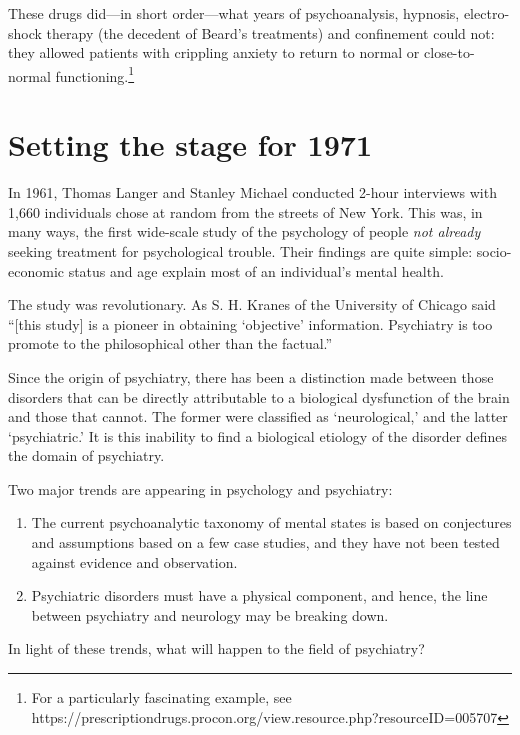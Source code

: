 \begin{refsection}
These drugs did—in short order—what years of psychoanalysis, hypnosis, electro-shock therapy (the decedent of Beard's treatments) and confinement could not: they allowed patients with crippling anxiety to return to normal or close-to-normal functioning.\footnote{For a particularly fascinating example, see https:\slash \slash prescriptiondrugs.procon.org\slash view.resource.php?resourceID=005707}

\section{Setting the stage for 1971}
\label{settingthestagefor1971}

In 1961, Thomas Langer and Stanley Michael conducted 2-hour interviews with 1,660 individuals chose at random from the streets of New York. This was, in many ways, the first wide-scale study of the psychology of people \emph{not already} seeking treatment for psychological trouble. Their findings are quite simple: socio-economic status and age explain most of an individual's mental health. 

The study was revolutionary. As S. H. Kranes of the University of Chicago said ``[this study] is a pioneer in obtaining `objective' information. Psychiatry is too promote to the philosophical other than the factual.'' ~\citep{Kraines:1964fy}

Since the origin of psychiatry, there has been a distinction made between those disorders that can be directly attributable to a biological dysfunction of the brain and those that cannot. The former were classified as `neurological,' and the latter `psychiatric.' It is this inability to find a biological etiology of the disorder defines the domain of psychiatry.

Two major trends are appearing in psychology and psychiatry: 

\begin{enumerate}
\item The current psychoanalytic taxonomy of mental states is based on conjectures and assumptions based on a few case studies, and they have not been tested against evidence and observation.

\item Psychiatric disorders must have a physical component, and hence, the line between psychiatry and neurology may be breaking down.

\end{enumerate}

In light of these trends, what will happen to the field of psychiatry?


\end{refsection}

